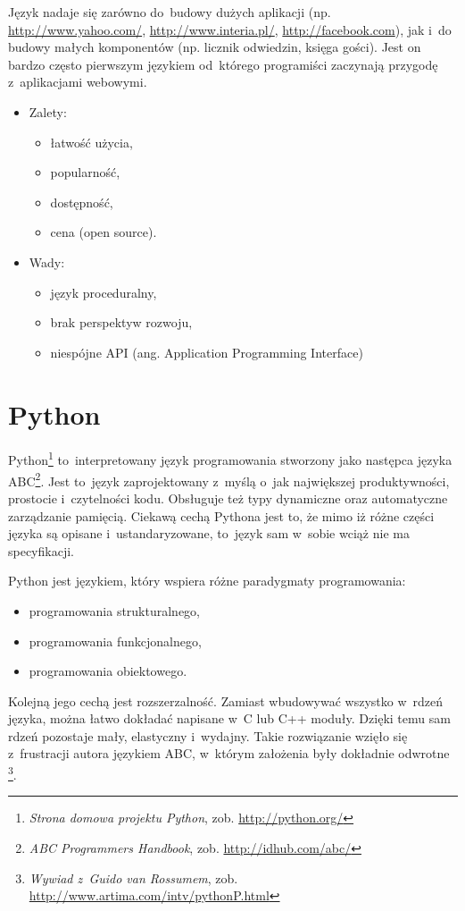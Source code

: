 \documentclass[a4paper,12pt,oneside]{report}
\begin{document}
Język nadaje się zarówno do~budowy dużych aplikacji (np. \url{http://www.yahoo.com/}, \url{http://www.interia.pl/}, \url{http://facebook.com}), jak i~do budowy małych komponentów (np. licznik odwiedzin, księga gości). Jest on bardzo często pierwszym językiem od~którego programiści zaczynają przygodę z~aplikacjami webowymi.
\begin{itemize}
\item Zalety:
  \begin{itemize}
  \item łatwość użycia, 
  \item popularność,
  \item dostępność,
  \item cena (open source).
  \end{itemize}
\item Wady:
  \begin{itemize}
  \item język proceduralny,
  \item brak perspektyw rozwoju,
  \item niespójne API (ang. Application Programming Interface)
  \end{itemize}
\end{itemize}

\section{Python}
\label{sec:python}
Python\footnote{\emph{Strona domowa projektu Python}, zob. \url{http://python.org/}} to~interpretowany język programowania stworzony jako następca języka ABC\footnote{\emph{ABC Programmers Handbook}, zob. \url{http://idhub.com/abc/}}. Jest to~język zaprojektowany z~myślą o~jak największej produktywności, prostocie i~czytelności kodu. Obsługuje też typy dynamiczne oraz automatyczne zarządzanie pamięcią. Ciekawą cechą Pythona jest to, że mimo iż różne części języka są opisane i~ustandaryzowane, to~język sam w~sobie wciąż nie ma specyfikacji. 

Python jest językiem, który wspiera różne paradygmaty programowania:
\begin{itemize}
  \item programowania strukturalnego,
  \item programowania funkcjonalnego,
  \item programowania obiektowego.
\end{itemize}

Kolejną jego cechą jest rozszerzalność. Zamiast wbudowywać wszystko w~rdzeń języka, można łatwo dokładać napisane w~C lub C++ moduły. Dzięki temu sam rdzeń pozostaje mały, elastyczny i~wydajny. Takie rozwiązanie wzięło się z~frustracji autora językiem ABC, w~którym założenia były dokładnie odwrotne \footnote{\emph{Wywiad z~Guido van Rossumem}, zob. \url{http://www.artima.com/intv/pythonP.html}}.
\end{document}
